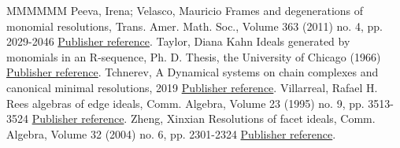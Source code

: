 \documentclass[11pt]{article}
\theoremstyle{definition}
\numberwithin{equation}{section}
\begin{document}
\begin{thebibliography}{MMMMMM}
 Peeva, Irena; Velasco, Mauricio Frames and degenerations of monomial resolutions, Trans. Amer. Math. Soc., Volume 363 (2011) no. 4, pp. 2029-2046 \href{https://alco.centre-mersenne.org/articles/10.5802/alco.325/#PV}{Publisher reference}.
 Taylor, Diana Kahn Ideals generated by monomials in an R-sequence, Ph. D. Thesis, the University of Chicago (1966) \href{https://alco.centre-mersenne.org/articles/10.5802/alco.325/#T}{Publisher reference}.
 Tchnerev, A Dynamical systems on chain complexes and canonical minimal resolutions, 2019 \href{https://alco.centre-mersenne.org/articles/10.5802/alco.325/#Tch}{Publisher reference}.
 Villarreal, Rafael H. Rees algebras of edge ideals, Comm. Algebra, Volume 23 (1995) no. 9, pp. 3513-3524 \href{https://alco.centre-mersenne.org/articles/10.5802/alco.325/#villa}{Publisher reference}.
 Zheng, Xinxian Resolutions of facet ideals, Comm. Algebra, Volume 32 (2004) no. 6, pp. 2301-2324 \href{https://alco.centre-mersenne.org/articles/10.5802/alco.325/#Z}{Publisher reference}.
\end{thebibliography}
\end{document}
